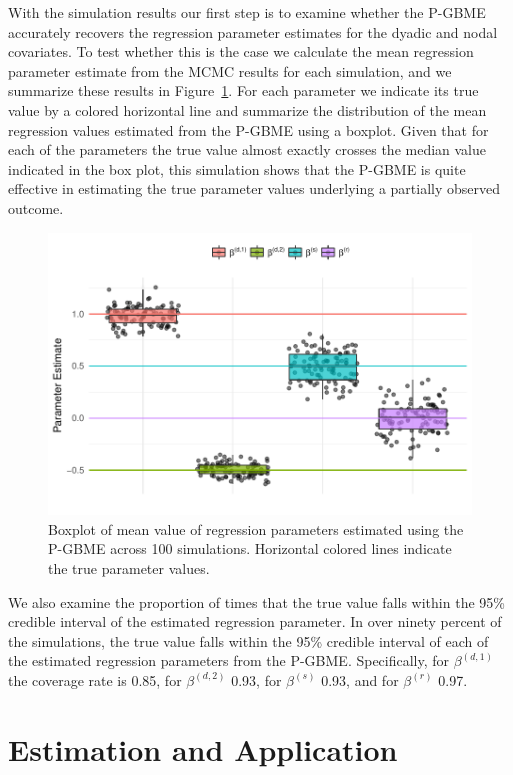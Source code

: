 \documentclass[a4paper, 12pt]{article}
\begin{document}
With the simulation results our first step is to examine whether the P-GBME accurately recovers the regression parameter estimates for the dyadic and nodal covariates. To test whether this is the case we calculate the mean regression parameter estimate from the MCMC results for each simulation, and we summarize these results in Figure~\ref{fig:simBias}. For each parameter we indicate its true value by a colored horizontal line and summarize the distribution of the mean regression values estimated from the P-GBME using a boxplot. Given that for each of the parameters the true value almost exactly crosses the median value indicated in the box plot, this simulation shows that the P-GBME is quite effective in estimating the true parameter values underlying a partially observed outcome. 

\begin{figure}[ht]
  \centering
  \includegraphics[width=1\textwidth]{figureA1.pdf}
  \caption{Boxplot of mean value of regression parameters estimated using the P-GBME across 100 simulations. Horizontal colored lines indicate the true parameter values.}
  \label{fig:simBias}
\end{figure}
\FloatBarrier

We also examine the proportion of times that the true value falls within the 95\% credible interval of the estimated regression parameter. In over ninety percent of the simulations, the true value falls within the 95\% credible interval of each of the estimated regression parameters from the P-GBME. Specifically, for $\beta^{(d,1)}$ the coverage rate is 0.85, for $\beta^{(d,2)}$ 0.93, for $\beta^{(s)}$ 0.93, and for $\beta^{(r)}$ 0.97.

\section{Estimation and Application}
\end{document}
